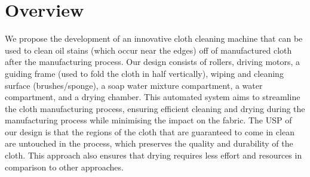 \documentclass[table,french,english]{rapportCS}
\begin{document}
\section{Overview}
We propose the development of an innovative cloth cleaning machine that can be used to clean oil stains (which occur near the edges) off of manufactured cloth after the manufacturing process. Our design consists of rollers, driving motors, a \gls{guiding frame}  (used to fold the cloth in half vertically), wiping and cleaning surface (brushes/sponge), a soap water mixture compartment, a water compartment, and a drying chamber. This automated system aims to streamline the cloth manufacturing process, ensuring efficient cleaning and drying during the manufacturing process while minimising the impact on the fabric. The USP of our design is that the regions of the cloth that are guaranteed to come in clean are untouched in the process, which preserves the quality and durability of the cloth. This approach also ensures that drying requires less effort and resources in comparison to other approaches.
\end{document}
